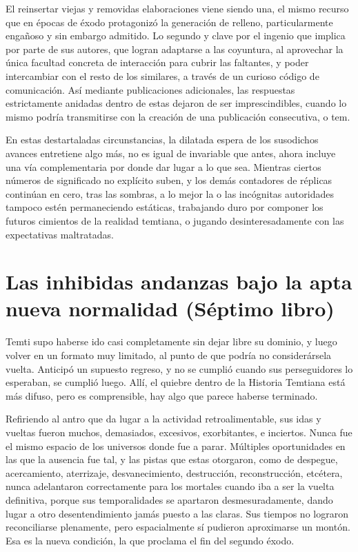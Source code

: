 \documentclass[
]{book}
\begin{document}
El reinsertar viejas y removidas elaboraciones viene siendo una, el mismo recurso que en épocas de éxodo protagonizó la generación de relleno, particularmente engañoso y sin embargo admitido. Lo segundo y clave por el ingenio que implica por parte de sus autores, que logran adaptarse a las coyuntura, al aprovechar la única facultad concreta de interacción para cubrir las faltantes, y poder intercambiar con el resto de los similares, a través de un curioso código de comunicación. Así mediante publicaciones adicionales, las respuestas estrictamente anidadas dentro de estas dejaron de ser imprescindibles, cuando lo mismo podría transmitirse con la creación de una publicación consecutiva, o tem.

En estas destartaladas circunstancias, la dilatada espera de los susodichos avances entretiene algo más, no es igual de invariable que antes, ahora incluye una vía complementaria por donde dar lugar a lo que sea. Mientras ciertos números de significado no explícito suben, y los demás contadores de réplicas continúan en cero, tras las sombras, a lo mejor la o las incógnitas autoridades tampoco estén permaneciendo estáticas, trabajando duro por componer los futuros cimientos de la realidad temtiana, o jugando desinteresadamente con las expectativas maltratadas.

\hypertarget{las-inhibidas-andanzas-bajo-la-apta-nueva-normalidad-suxe9ptimo-libro}{%
\chapter{Las inhibidas andanzas bajo la apta nueva normalidad (Séptimo libro)}\label{las-inhibidas-andanzas-bajo-la-apta-nueva-normalidad-suxe9ptimo-libro}}

Temti supo haberse ido casi completamente sin dejar libre su dominio, y luego volver en un formato muy limitado, al punto de que podría no considerársela vuelta. Anticipó un supuesto regreso, y no se cumplió cuando sus perseguidores lo esperaban, se cumplió luego. Allí, el quiebre dentro de la Historia Temtiana está más difuso, pero es comprensible, hay algo que parece haberse terminado.

Refiriendo al antro que da lugar a la actividad retroalimentable, sus idas y vueltas fueron muchos, demasiados, excesivos, exorbitantes, e inciertos. Nunca fue el mismo espacio de los universos donde fue a parar. Múltiples oportunidades en las que la ausencia fue tal, y las pistas que estas otorgaron, como de despegue, acercamiento, aterrizaje, desvanecimiento, destrucción, reconstrucción, etcétera, nunca adelantaron correctamente para los mortales cuando iba a ser la vuelta definitiva, porque sus temporalidades se apartaron desmesuradamente, dando lugar a otro desentendimiento jamás puesto a las claras. Sus tiempos no lograron reconciliarse plenamente, pero espacialmente sí pudieron aproximarse un montón. Esa es la nueva condición, la que proclama el fin del segundo éxodo.
\end{document}
